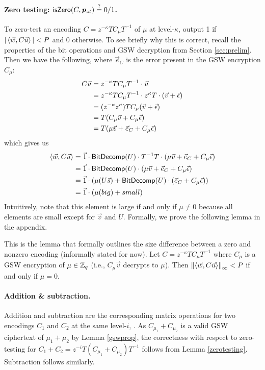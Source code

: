\paragraph{Zero testing:  $\mathsf{isZero}(C, \bm{p}_{zt}) \stackrel{?}{=} 0/1$.}  To zero-test an encoding $C = z^{-\kappa} T C_\mu T^{-1}$ of $\mu$ at level-$\kappa$, output 1 if $|\left<\vec{w}, C\vec{u}\right>| < P$ and 0 otherwise.  To see briefly why this is correct, recall the properties of the bit operations and GSW decryption from Section \ref{sec:prelim}.  Then we have the following, where $\vec{e}_C$ is the error present in the GSW encryption $C_\mu$:
\begin{align*}
C\vec{u} &= z^{-\kappa} T C_\mu T^{-1} \cdot \vec{u}\\
&= z^{-\kappa} T C_\mu  T^{-1} \cdot z^\kappa T\cdot (\vec{v} + \vec{\epsilon})\\
&= (z^{-\kappa} z^{\kappa}) T C_\mu (\vec{v} + \vec{\epsilon})\\
&= T (C_\mu\vec{v} + C_\mu\vec{\epsilon})\\
&= T (\mu \vec{v} + \vec{e}_C + C_\mu\vec{\epsilon})
\end{align*}
which gives us
\begin{align*}
\left<\vec{w}, C\vec{u}\right> &= \vec{1}\cdot\mathsf{BitDecomp}(U)\cdot T^{-1} T \cdot (\mu \vec{v} + \vec{e}_C + C_\mu\vec{\epsilon})\\
&= \vec{1}\cdot\mathsf{BitDecomp}(U) \cdot (\mu \vec{v} + \vec{e}_C + C_\mu\vec{\epsilon})\\
&= \vec{1}\cdot(\mu(U \vec{s}) + \mathsf{BitDecomp}(U)\cdot (\vec{e}_C + C_\mu\vec{\epsilon}))\\
&= \vec{1}\cdot(\mu(big) + small)
\end{align*} 
Intuitively, note that this element is large if and only if $\mu \not= 0$ because all elements are small except for $\vec{v}$ and $U$.  Formally, we prove the following lemma in the appendix.

\begin{lemma}
\label{zerotesting}
This is the lemma that formally outlines the size difference between a zero and nonzero encoding (informally stated for now).  Let $C = z^{-\kappa} TC_\mu T^{-1}$ where $C_\mu$ is a GSW encryption of $\mu \in \mathbb{Z}_q$ (i.e., $C_\mu\vec{v}$ decrypts to $\mu$).  Then $\left\lVert\left<\vec{w}, C\vec{u}\right>\right\rVert_\infty < P$ if and only if $\mu = 0$.
\end{lemma}

\paragraph{Addition \& subtraction.}  Addition and subtraction are the corresponding matrix operations for two encodings $C_1$ and $C_2$ at the same level-$i$, . As $C_{\mu_1}+ C_{\mu_2}$ is a valid GSW ciphertext of $\mu_1 + \mu_2$ by Lemma \ref{gswprop}, the correctness with respect to zero-testing for $C_1 + C_2 = z^{-i}T(C_{\mu_1}+C_{\mu_2})T^{-1}$ follows from Lemma \ref{zerotesting}.  Subtraction follows similarly.

